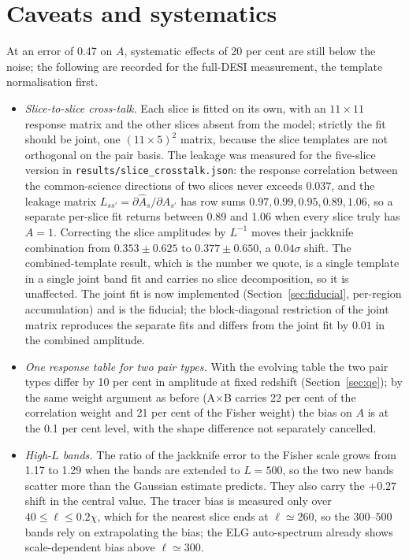 \documentclass[11pt,a4paper]{article}
\begin{document}
\section{Caveats and systematics}
\label{sec:caveats}
At an error of 0.47 on $A$, systematic effects of 20 per cent are still below the noise; the following are recorded for the full-DESI measurement, the template normalisation first.
\begin{itemize}
\item \emph{Slice-to-slice cross-talk.} Each slice is fitted on its own, with an $11\times11$ response matrix and the other slices absent from the model; strictly the fit should be joint, one $(11\times5)^2$ matrix, because the slice templates are not orthogonal on the pair basis. The leakage was measured for the five-slice version in \texttt{results/slice\_crosstalk.json}: the response correlation between the common-science directions of two slices never exceeds $0.037$, and the leakage matrix $L_{ss'}=\partial\hat A_s/\partial A_{s'}$ has row sums $0.97,0.99,0.95,0.89,1.06$, so a separate per-slice fit returns between 0.89 and 1.06 when every slice truly has $A=1$. Correcting the slice amplitudes by $L^{-1}$ moves their jackknife combination from $0.353\pm0.625$ to $0.377\pm0.650$, a $0.04\sigma$ shift. The combined-template result, which is the number we quote, is a single template in a single joint band fit and carries no slice decomposition, so it is unaffected. The joint fit is now implemented (Section~\ref{sec:fiducial}, per-region accumulation) and is the fiducial; the block-diagonal restriction of the joint matrix reproduces the separate fits and differs from the joint fit by $0.01$ in the combined amplitude.
\item \emph{One response table for two pair types.} With the evolving table the two pair types differ by 10 per cent in amplitude at fixed redshift (Section~\ref{sec:qe}); by the same weight argument as before (A$\times$B carries 22 per cent of the correlation weight and 21 per cent of the Fisher weight) the bias on $A$ is at the 0.1 per cent level, with the shape difference not separately cancelled.
\item \emph{High-$L$ bands.} The ratio of the jackknife error to the Fisher scale grows from 1.17 to 1.29 when the bands are extended to $L=500$, so the two new bands scatter more than the Gaussian estimate predicts. They also carry the $+0.27$ shift in the central value. The tracer bias is measured only over $40\le\ell\le0.2\chi$, which for the nearest slice ends at $\ell\simeq260$, so the $300$--$500$ bands rely on extrapolating the bias; the ELG auto-spectrum already shows scale-dependent bias above $\ell\simeq300$.

\end{itemize}
\end{document}
